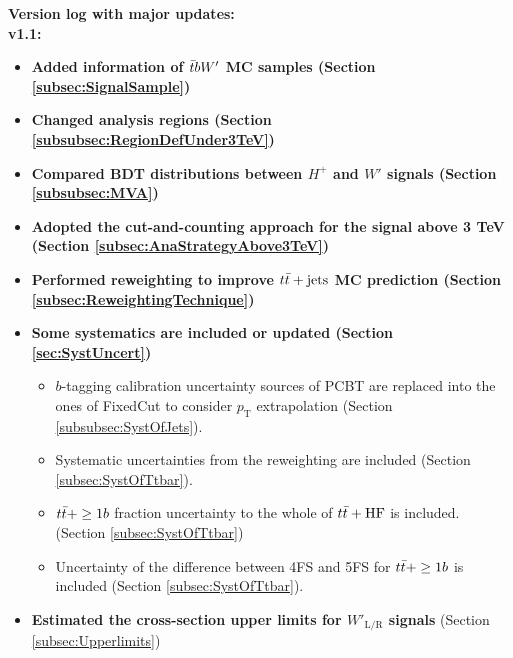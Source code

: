 \textbf{Version log with major updates:}\\
\textbf{\color{blue}v1.1:}

\begin{itemize}
    \item \textbf{Added information of $\Bar{t}bW'$ MC samples (Section \ref{subsec:SignalSample})}
    \item \textbf{Changed analysis regions (Section \ref{subsubsec:RegionDefUnder3TeV})}
    \item \textbf{Compared BDT distributions between $H^{+}$ and $W'$ signals (Section \ref{subsubsec:MVA})}
    \item \textbf{Adopted the cut-and-counting approach for the signal above 3 TeV (Section \ref{subsec:AnaStrategyAbove3TeV})}
    \item \textbf{Performed reweighting to improve $t\Bar{t}+\text{jets}$ MC prediction (Section \ref{subsec:ReweightingTechnique})}
    \item \textbf{Some systematics are included or updated (Section \ref{sec:SystUncert})}
    \begin{itemize}
        \item $b$-tagging calibration uncertainty sources of PCBT are replaced into the ones of FixedCut to consider $p_{\text{T}}$ extrapolation (Section \ref{subsubsec:SystOfJets}).
        \item Systematic uncertainties from the reweighting are included (Section \ref{subsec:SystOfTtbar}).
        \item $t\Bar{t}+\geq1b$ fraction uncertainty to the whole of $t\Bar{t}+\text{HF}$ is included. (Section \ref{subsec:SystOfTtbar})
        \item Uncertainty of the difference between 4FS and 5FS for $t\Bar{t}+\geq1b$ is included (Section \ref{subsec:SystOfTtbar}).
    \end{itemize}
    \item \textbf{Estimated the cross-section upper limits for $W'_{\text{L/R}}$ signals} (Section \ref{subsec:Upperlimits})
\end{itemize}